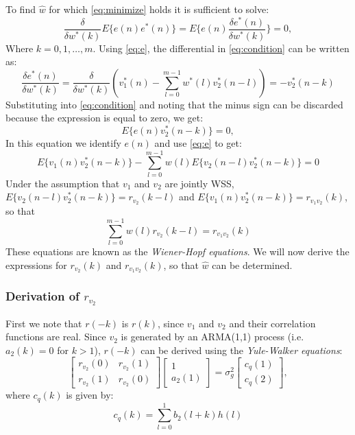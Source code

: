 \documentclass[12pt,a4paper]{article}
\begin{document}
To find $\hat{w}$ for which \autoref{eq:minimize} holds it is sufficient to solve:
\begin{equation}\label{eq:condition}
\frac{\delta}{\delta w^*(k)} E\{e(n)e^*(n)\} = E\{e(n) \frac{\delta e^*(n)}{\delta w^*(k)}\} = 0,
\end{equation}
Where $k = 0, 1, \dots, m$. Using \autoref{eq:e}, the differential in \autoref{eq:condition} can be written as: 
\begin{equation}
\frac{\delta e^*(n)}{\delta w^*(k)} = \frac{\delta}{\delta w^*(k)}\left(v^*_1(n) - \sum\limits_{l=0}^{m-1}w^*(l)v_2^*(n-l)\right) = -v_2^*(n-k)
\end{equation}
Substituting into \autoref{eq:condition} and noting that the minus sign can be discarded because the expression is equal to zero, we get:
\begin{equation}
E\{e(n)v_2^*(n-k)\} = 0,
\end{equation}
In this equation we identify $e(n)$ and use \autoref{eq:e} to get:
\begin{equation}
E\{v_1(n)v_2^*(n-k)\} - \sum\limits_{l=0}^{m-1}w(l)E\{v_2(n-l)v_2^*(n-k)\} = 0
\end{equation}
Under the assumption that $v_1$ and $v_2$ are jointly WSS, $E\{v_2(n-l)v_2^*(n-k)\} = r_{v_{2}}(k-l)$ and
$E\{v_1(n)v_2^*(n - k)\} = r_{v_{1}v_{2}}(k)$, so that
\begin{equation}
\sum\limits_{l=0}^{m-1}w(l)r_{v_{2}}(k-l) = r_{v_{1}v_{2}}(k)
\end{equation}
These equations are known as the \emph{Wiener-Hopf equations}. We will now derive the expressions for $r_{v_2}(k)$ and $r_{v_{1}v_{2}}(k)$, so that $\hat{w}$ can be determined. 

\subsubsection*{Derivation of $r_{v_2}$}
First we note that $r(-k)$ is $r(k)$, since $v_1$ and $v_2$ and their correlation functions are real. Since $v_2$ is generated by an ARMA(1,1) process (i.e. $a_2(k)=0$ for $k>1$), $r(-k)$ can be derived using the \emph{Yule-Walker equations}:	
\begin{equation}\label{eq:yule}
\begin{bmatrix}
  r_{v_2}(0) & r_{v_2}(1)\\
  r_{v_2}(1) & r_{v_2}(0)
\end{bmatrix}
\begin{bmatrix}
  1\\
  a_2(1)
\end{bmatrix}
=
\sigma_g^2
\begin{bmatrix}
  c_q(1)\\
  c_q(2)
\end{bmatrix},
\end{equation}
where $c_q(k)$ is given by:
\begin{equation}\label{eq:c}
c_q(k) = \sum\limits_{l=0}^{1}b_2(l+k)h(l)
\end{equation}
\end{document}

